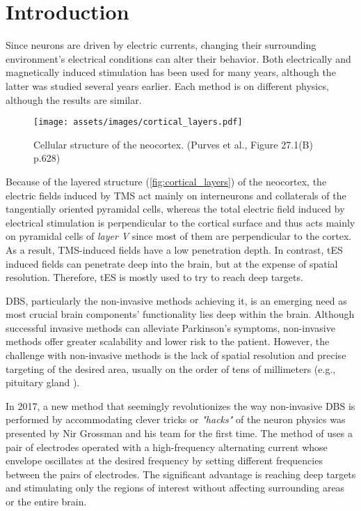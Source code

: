 \pagebreak
{}
\chapter{Introduction}
Since neurons are driven by electric currents, changing their surrounding environment's electrical conditions can alter their behavior. Both electrically and magnetically induced stimulation has been used for many years, although the latter was studied several years earlier. Each method is on different physics, although the results are similar.

\begin{wrapfigure}{l}{0.40\textwidth}
    \centering
    \texttt{[image: assets/images/cortical\_layers.pdf]}
    \caption{Cellular structure of the neocortex. (Purves et al.\cite{Purves2012}, Figure 27.1(B) p.628)}
    \label{fig:cortical_layers}
\end{wrapfigure}

Because of the layered structure (\autoref{fig:cortical_layers}) of the neocortex, the electric fields induced by \gls{TMS} act mainly on interneurons and collaterals of the tangentially oriented pyramidal cells, whereas the total electric field induced by electrical stimulation is perpendicular to the cortical surface and thus acts mainly on pyramidal cells of \textit{layer V} since most of them are perpendicular to the cortex. As a result, \gls{TMS}-induced fields have a low penetration depth. In contrast, \gls{tES} induced fields can penetrate deep into the brain, but at the expense of spatial resolution. Therefore, \gls{tES} is mostly used to try to reach deep targets. 

\gls{DBS}, particularly the non-invasive methods achieving it, is an emerging need as most crucial brain components' functionality lies deep within the brain. Although successful invasive methods can alleviate Parkinson's symptoms, non-invasive methods offer greater scalability and lower risk to the patient. However, the challenge with non-invasive methods is the lack of spatial resolution and precise targeting of the desired area, usually on the order of tens of millimeters (e.g., pituitary gland \cite{Yadav2017_pituitary}).

In 2017, a new method that seemingly revolutionizes the way non-invasive \gls{DBS} is performed by accommodating clever tricks or \textit{"hacks"} of the neuron physics was presented by Nir Grossman and his team \cite{Grossman2017} for the first time. The method of  uses a pair of electrodes operated with a high-frequency alternating current whose envelope oscillates at the desired frequency by setting different frequencies between the pairs of electrodes. The significant advantage is reaching deep targets and stimulating only the regions of interest without affecting surrounding areas or the entire brain.

